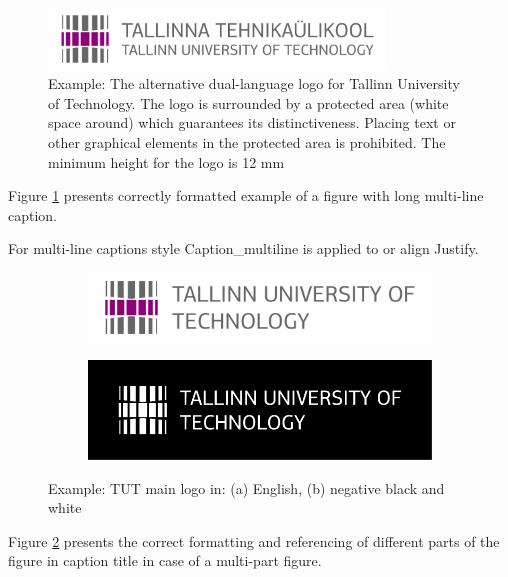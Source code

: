 \begin{figure}[!ht]
\centering
\includegraphics[width=0.8\textwidth]{figures/TTU_alternatiivne_logo_EST_ENG_print}
\caption{Example: The alternative dual-language logo for Tallinn University of Technology. The logo is surrounded by a protected area (white space around) which guarantees its distinctiveness. Placing text or other graphical elements in the protected area is prohibited. The minimum height for the logo is 12 mm}
\label{fig:logo2}
\end{figure}

Figure \ref{fig:logo2} presents correctly formatted example of a figure with long multi-line caption.


For multi-line captions style Caption\_multiline is applied to or align Justify.

\begin{figure}[!ht]
\centering
	 \begin{subfigure}[b]{0.45\textwidth}
    \includegraphics[width=\textwidth]{figures/TTU_peamine_logo_ENG_print}
        \caption{}
    \end{subfigure}
    \qquad
    \begin{subfigure}[b]{0.45\textwidth}
    \includegraphics[width=\textwidth]{figures/ttu_peamine_logo_eng_must-valge_negatiivis}
        \caption{}
    \end{subfigure}
    \caption{Example: TUT main logo in: (a) English, (b) negative black and white}
    \label{fig:logo3}
\end{figure}

Figure \ref{fig:logo3} presents the correct formatting and referencing of different parts of the figure in
caption title in case of a multi-part figure.


